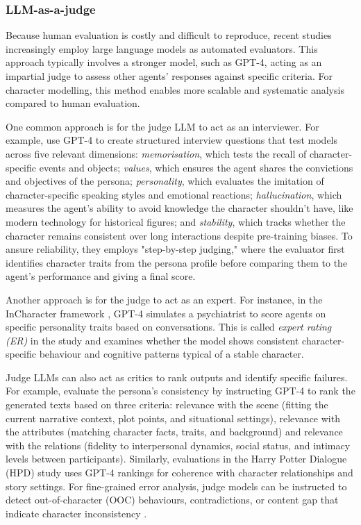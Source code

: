 \documentclass{article}
\begin{document}
\subsubsection{LLM-as-a-judge} \label{sec:background_llm_judge}

Because human evaluation is costly and difficult to reproduce, recent studies increasingly employ large language models as automated evaluators. This approach typically involves a stronger model, such as GPT-4, acting as an impartial judge to assess other agents' responses against specific criteria. For character modelling, this method enables more scalable and systematic analysis compared to human evaluation.

One common approach is for the judge LLM to act as an interviewer. For example, \citet{shao2023characterllm} use GPT-4 to create structured interview questions that test models across five relevant dimensions: \textit{memorisation}, which tests the recall of character-specific events and objects; \textit{values}, which ensures the agent shares the convictions and objectives of the persona; \textit{personality}, which evaluates the imitation of character-specific speaking styles and emotional reactions; \textit{hallucination}, which measures the agent's ability to avoid knowledge the character shouldn't have, like modern technology for historical figures; and \textit{stability}, which tracks whether the character remains consistent over long interactions despite pre-training biases. To ansure reliability, they employs "step-by-step judging," where the evaluator first identifies character traits from the persona profile before comparing them to the agent's performance and giving a final score.

Another approach is for the judge to act as an expert. For instance, in the InCharacter framework \citet{wang2024incharacter}, GPT-4 simulates a psychiatrist to score agents on specific personality traits based on conversations. This is called \textit{expert rating (ER)} in the study and examines whether the model shows consistent character-specific behaviour and cognitive patterns typical of a stable character.

Judge LLMs can also act as critics to rank outputs and identify specific failures. For example, \citet{wang2024rolellm} evaluate the persona's consistency by instructing GPT-4 to rank the generated texts based on three criteria: relevance with the scene (fitting the current narrative context, plot points, and situational settings), relevance with the attributes (matching character facts, traits, and background) and relevance with the relations (fidelity to interpersonal dynamics, social status, and intimacy levels between participants). Similarly, evaluations in the Harry Potter Dialogue (HPD) study \citep{chen2023hp} uses GPT-4 rankings for coherence with character relationships and story settings. For fine-grained error analysis, judge models can be instructed to detect out-of-character (OOC) behaviours, contradictions, or content gap that indicate character inconsistency \citep{zhou2023characterglm}.
\end{document}

